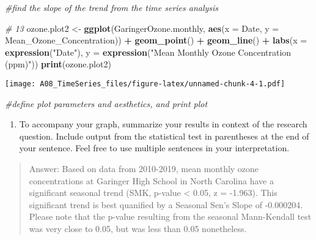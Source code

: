 \documentclass[
]{article}
\newenvironment{Shaded}{\begin{snugshade}}{\end{snugshade}}
\newcommand{\CommentTok}[1]{\textcolor[rgb]{0.56,0.35,0.01}{\textit{#1}}}
\newcommand{\DataTypeTok}[1]{\textcolor[rgb]{0.13,0.29,0.53}{#1}}
\newcommand{\KeywordTok}[1]{\textcolor[rgb]{0.13,0.29,0.53}{\textbf{#1}}}
\newcommand{\NormalTok}[1]{#1}
\newcommand{\OperatorTok}[1]{\textcolor[rgb]{0.81,0.36,0.00}{\textbf{#1}}}
\newcommand{\StringTok}[1]{\textcolor[rgb]{0.31,0.60,0.02}{#1}}
\providecommand{\tightlist}{%
  \setlength{\itemsep}{0pt}\setlength{\parskip}{0pt}}
\begin{document}
\begin{Shaded}
\begin{Highlighting}[]
  \CommentTok{#find the slope of the trend from the time series analysis}

\CommentTok{# 13}
\NormalTok{ozone.plot2 <-}
\StringTok{  }\KeywordTok{ggplot}\NormalTok{(GaringerOzone.monthly, }\KeywordTok{aes}\NormalTok{(}\DataTypeTok{x =}\NormalTok{ Date, }\DataTypeTok{y =}\NormalTok{ Mean_Ozone_Concentration)) }\OperatorTok{+}
\StringTok{    }\KeywordTok{geom_point}\NormalTok{() }\OperatorTok{+}
\StringTok{    }\KeywordTok{geom_line}\NormalTok{() }\OperatorTok{+}
\StringTok{    }\KeywordTok{labs}\NormalTok{(}\DataTypeTok{x =} \KeywordTok{expression}\NormalTok{(}\StringTok{"Date"}\NormalTok{), }\DataTypeTok{y =} \KeywordTok{expression}\NormalTok{(}\StringTok{"Mean Monthly Ozone Concentration (ppm)"}\NormalTok{))}
\KeywordTok{print}\NormalTok{(ozone.plot2)}
\end{Highlighting}
\end{Shaded}

\texttt{[image: A08\_TimeSeries\_files/figure-latex/unnamed-chunk-4-1.pdf]}

\begin{Shaded}
\begin{Highlighting}[]
\CommentTok{#define plot parameters and aesthetics, and print plot}
\end{Highlighting}
\end{Shaded}

\begin{enumerate}
\def\labelenumi{\arabic{enumi}.}
\setcounter{enumi}{13}
\tightlist
\item
  To accompany your graph, summarize your results in context of the
  research question. Include output from the statistical test in
  parentheses at the end of your sentence. Feel free to use multiple
  sentences in your interpretation.
\end{enumerate}

\begin{quote}
Answer: Based on data from 2010-2019, mean monthly ozone concentrations
at Garinger High School in North Carolina have a significant seasonal
trend (SMK, p-value \textless{} 0.05, z = -1.963). This significant
trend is best quanified by a Seasonal Sen's Slope of -0.000204. Please
note that the p-value resulting from the seasonal Mann-Kendall test was
very close to 0.05, but was less than 0.05 nonetheless.
\end{quote}
\end{document}
